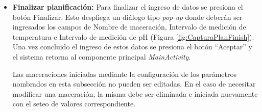 \begin{itemize}
                    \item \textbf{Finalizar planificación:} Para finalizar el ingreso de datos se presiona el botón Finalizar. Esto despliega un diálogo tipo \textit{pop-up} donde deberán ser ingresados los campos de Nombre de maceración, Intervalo de medición de temperatura e Intervalo de medición de pH (Figura \ref{fig:CapturaPlanFinish}). Una vez concluido el ingreso de estos datos se presiona el botón ``Aceptar'' y el sistema retorna al componente principal \textit{MainActivity}. 
                    
                    \par Las maceraciones iniciadas mediante la configuración de los parámetros nombrados en esta subsección no pueden ser editadas. En el caso de necesitar modificar una maceración, la misma debe ser eliminada e iniciada nuevamente con el seteo de valores correspondiente.
                \end{itemize}
            
